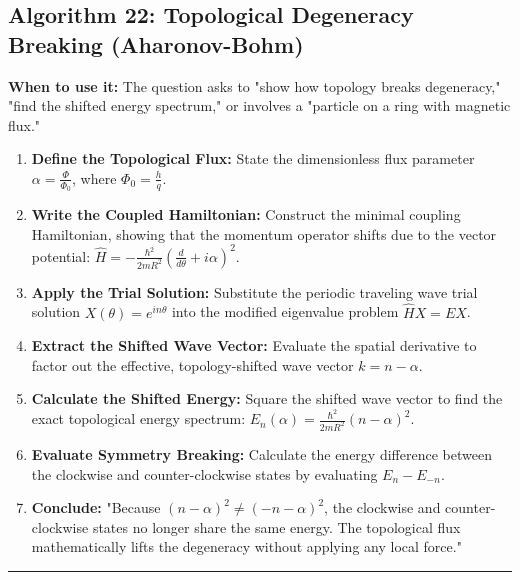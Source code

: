 \documentclass[11pt, a4paper]{report}
\begin{document}
\subsection*{Algorithm 22: Topological Degeneracy Breaking (Aharonov-Bohm)}
\textbf{When to use it:} The question asks to "show how topology breaks degeneracy," "find the shifted energy spectrum," or involves a "particle on a ring with magnetic flux."
\begin{enumerate}[label=\textbf{\arabic*.}]
    \item \textbf{Define the Topological Flux:} State the dimensionless flux parameter $\alpha = \frac{\Phi}{\Phi_0}$, where $\Phi_0 = \frac{h}{q}$.
    \item \textbf{Write the Coupled Hamiltonian:} Construct the minimal coupling Hamiltonian, showing that the momentum operator shifts due to the vector potential: $\hat{H} = -\frac{\hbar^2}{2mR^2}\left(\frac{d}{d\theta} + i\alpha\right)^2$.
    \item \textbf{Apply the Trial Solution:} Substitute the periodic traveling wave trial solution $X(\theta) = e^{in\theta}$ into the modified eigenvalue problem $\hat{H}X = EX$.
    \item \textbf{Extract the Shifted Wave Vector:} Evaluate the spatial derivative to factor out the effective, topology-shifted wave vector $k = n - \alpha$.
    \item \textbf{Calculate the Shifted Energy:} Square the shifted wave vector to find the exact topological energy spectrum: $E_n(\alpha) = \frac{\hbar^2}{2mR^2}(n - \alpha)^2$.
    \item \textbf{Evaluate Symmetry Breaking:} Calculate the energy difference between the clockwise and counter-clockwise states by evaluating $E_n - E_{-n}$.
    \item \textbf{Conclude:} "Because $(n-\alpha)^2 \neq (-n-\alpha)^2$, the clockwise and counter-clockwise states no longer share the same energy. The topological flux mathematically lifts the degeneracy without applying any local force."
\end{enumerate}
\vspace{1em}
\noindent\rule{\textwidth}{0.4pt}
\vspace{1em}
\end{document}
